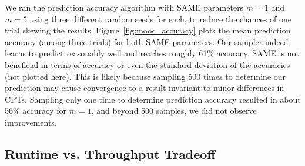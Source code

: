 \documentclass{article} %
\begin{document}
We ran the prediction accuracy algorithm with SAME parameters $m=1$ and $m=5$ using three different
random seeds for each, to reduce the chances of one trial skewing the results.
Figure~\ref{fig:mooc_accuracy} plots the mean prediction accuracy (among three trials) for both SAME
parameters. Our sampler indeed learns to predict reasonably well and reaches roughly 61\% accuracy.
SAME is not beneficial in terms of accuracy or even the standard deviation of the accuracies (not
plotted here). This is likely because sampling 500 times to determine our prediction may cause
convergence to a result invariant to minor differences in CPTs.  Sampling only one time to determine
prediction accuracy resulted in about 56\% accuracy for $m=1$, and beyond 500 samples, we did not
observe improvements.

\subsection{Runtime vs. Throughput Tradeoff}\label{ssec:tradeoff}

%
%
\end{document}
